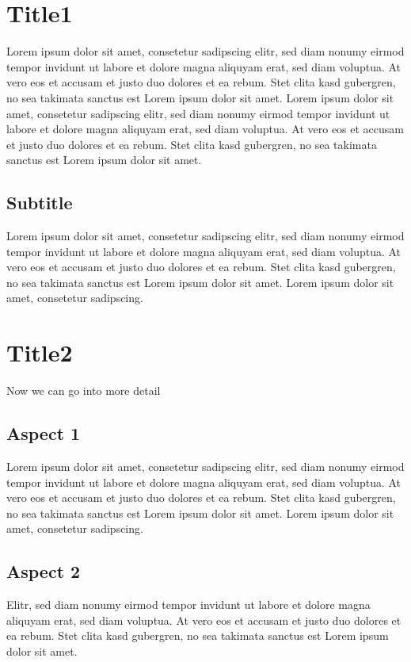 
\section{Title1}
Lorem ipsum dolor sit amet, consetetur sadipscing elitr, sed diam nonumy eirmod tempor invidunt ut labore et dolore
magna aliquyam erat, sed diam voluptua. At vero eos et accusam et justo duo dolores et ea rebum. Stet clita kasd
gubergren, no sea takimata sanctus est Lorem ipsum dolor sit amet. Lorem ipsum dolor sit amet,
consetetur sadipscing
elitr, sed diam nonumy eirmod tempor invidunt ut labore et dolore magna aliquyam erat, sed diam voluptua. At vero
eos et accusam et justo duo dolores et ea rebum. Stet clita kasd gubergren, no sea takimata sanctus est Lorem ipsum
dolor sit amet.

\subsection{Subtitle}
Lorem ipsum dolor sit amet, consetetur sadipscing elitr, sed diam nonumy eirmod tempor invidunt ut labore et dolore
magna aliquyam erat, sed diam voluptua. At vero eos et accusam et justo duo dolores et ea rebum. Stet clita kasd
gubergren, no sea takimata sanctus est Lorem ipsum dolor sit amet. Lorem ipsum dolor sit amet,
consetetur sadipscing.

\section{Title2}
Now we can go into more detail

\subsection{Aspect 1}
Lorem ipsum dolor sit amet, consetetur sadipscing elitr, sed diam nonumy eirmod tempor invidunt ut labore et dolore
magna aliquyam erat, sed diam voluptua. At vero eos et accusam et justo duo dolores et ea rebum. Stet clita kasd
gubergren, no sea takimata sanctus est Lorem ipsum dolor sit amet. Lorem ipsum dolor sit amet,
consetetur sadipscing.

\subsection{Aspect 2}
Elitr, sed diam nonumy eirmod tempor invidunt ut labore et dolore magna aliquyam erat, sed diam voluptua. At vero
eos et accusam et justo duo dolores et ea rebum. Stet clita kasd gubergren, no sea takimata sanctus est Lorem ipsum
dolor sit amet.

